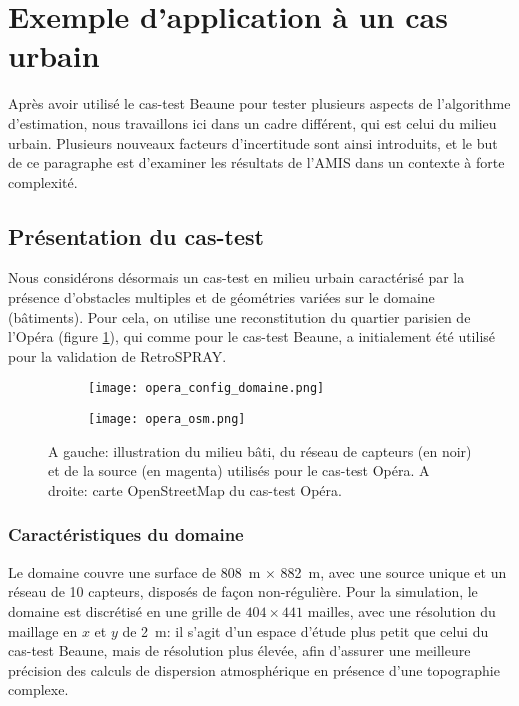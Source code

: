 \section{Exemple d'application à un cas urbain}

Après avoir utilisé le cas-test Beaune pour tester plusieurs aspects de l'algorithme d'estimation, nous travaillons ici dans un cadre différent, qui est celui du milieu urbain. Plusieurs nouveaux facteurs d'incertitude sont ainsi introduits, et le but de ce paragraphe est d'examiner les résultats de l'AMIS dans un contexte à forte complexité.\\

\subsection{Présentation du cas-test}

Nous considérons désormais un cas-test en milieu urbain caractérisé par la présence d'obstacles multiples et de géométries variées sur le domaine (bâtiments). Pour cela, on utilise une reconstitution du quartier parisien de l'Opéra (figure \ref{fig_opera_config}), qui comme pour le cas-test Beaune, a initialement été utilisé pour la validation de RetroSPRAY.\\



\begin{figure}[h!]
	\centering
	\begin{subfigure}[t]{0.5\textwidth}
		\centering
		\texttt{[image: opera\_config\_domaine.png]}
		\caption{}
		\label{fig_opera_config}
	\end{subfigure}%
	\begin{subfigure}[t]{0.5\textwidth}
		\centering
		\texttt{[image: opera\_osm.png]}
		\caption{}
		\label{fig_opera_carte}
	\end{subfigure}
	\caption{A gauche: illustration du milieu bâti, du réseau de capteurs (en noir) et de la source (en magenta) utilisés pour le cas-test Opéra. A droite: carte OpenStreetMap du cas-test Opéra.}
	\label{fig_opera_presentation}
\end{figure}

\subsubsection{Caractéristiques du domaine}
Le domaine couvre une surface de \SI{808}{\meter} $\times$ \SI{882}{\meter}, avec une source unique et un réseau de 10 capteurs, disposés de façon non-régulière. Pour la simulation, le domaine est discrétisé en une grille de $404 \times 441$ mailles, avec une résolution du maillage en $x$ et $y$ de \SI{2}{\meter}: il s'agit d'un espace d'étude plus petit que celui du cas-test Beaune, mais de résolution plus élevée, afin d'assurer une meilleure précision des calculs de dispersion atmosphérique en présence d'une topographie complexe. \\


